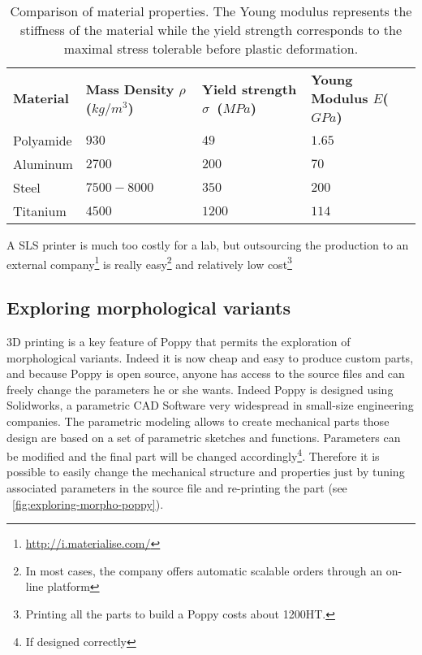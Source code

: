 \begin{table}[tb]
    \centering
    \begin{tabularx}{0.8\linewidth }{l X X X}
        \textbf{Material} & \textbf{Mass Density $\rho$ ($kg/m^3$)} &  \textbf{Yield strength $\sigma$~($MPa$)} & \textbf{Young Modulus $E$($GPa$)}\\
        Polyamide & $930$ & $49$ & $1.65$\\

        Aluminum & $2700$ & $200$ & $70$\\

        Steel & $7500-8000$ & $350$ & $200$\\

        Titanium & $4500$ & $1200$ & $114$\\

    \end{tabularx}

    \caption{Comparison of material properties.
    The Young modulus represents the stiffness of the material while the yield strength corresponds to the maximal stress tolerable before plastic deformation.}
    \label{tab:materials}
\end{table}

A SLS printer is much too costly for a lab, but outsourcing the production to an external company\footnote{\url{http://i.materialise.com/}} is really easy\footnote{In most cases, the company offers automatic scalable orders through an on-line platform} and relatively low cost\footnote{Printing all the parts to build a Poppy costs about 1200\texteuro HT.}

\subsection{Exploring morphological variants} %


3D printing is a key feature of Poppy that permits the exploration of morphological variants. Indeed it is now cheap and easy to produce custom parts, and because Poppy is open source, anyone has access to the source files and can freely change the parameters he or she wants. Indeed Poppy is designed using Solidworks, a parametric CAD Software very widespread in small-size engineering companies. The parametric modeling allows to create mechanical parts those design are based on a set of parametric sketches and functions. Parameters can be modified and the final part will be changed accordingly\footnote{If designed correctly}. Therefore it is possible to easily change the mechanical structure and properties just by tuning associated parameters in the source file and re-printing the part (see \figurename~\ref{fig:exploring-morpho-poppy}).

